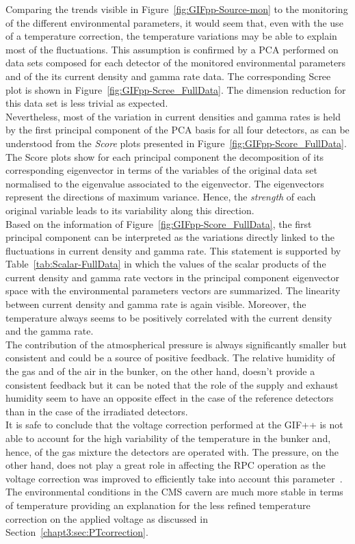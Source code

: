 	Comparing the trends visible in Figure~\ref{fig:GIFpp-Source-mon} to the monitoring of the different environmental parameters, it would seem that, even with the use of a temperature correction, the temperature variations may be able to explain most of the fluctuations. This assumption is confirmed by a PCA performed on data sets composed for each detector of the monitored environmental parameters and of the its current density and gamma rate data. The corresponding Scree plot is shown in Figure~\ref{fig:GIFpp-Scree_FullData}. The dimension reduction for this data set is less trivial as expected.\\
	Nevertheless, most of the variation in current densities and gamma rates is held by the first principal component of the PCA basis for all four detectors, as can be understood from the \textit{Score} plots presented in Figure~\ref{fig:GIFpp-Score_FullData}. The Score plots show for each principal component the decomposition of its corresponding eigenvector in terms of the variables of the original data set normalised to the eigenvalue associated to the eigenvector. The eigenvectors represent the directions of maximum variance. Hence, the \textit{strength} of each original variable leads to its variability along this direction.\\
	Based on the information of Figure~\ref{fig:GIFpp-Score_FullData}, the first principal component can be interpreted as the variations directly linked to the fluctuations in current density and gamma rate. This statement is supported by Table~\ref{tab:Scalar-FullData} in which the values of the scalar products of the current density and gamma rate vectors in the principal component eigenvector space with the environmental parameters vectors are summarized. The linearity between current density and gamma rate is again visible. Moreover, the temperature always seems to be positively correlated with the current density and the gamma rate.\\
	The contribution of the atmospherical pressure is always significantly smaller but consistent and could be a source of positive feedback. The relative humidity of the gas and of the air in the bunker, on the other hand, doesn't provide a consistent feedback but it can be noted that the role of the supply and exhaust humidity seem to have an opposite effect in the case of the reference detectors than in the case of the irradiated detectors.\\
	It is safe to conclude that the voltage correction performed at the GIF++ is not able to account for the high variability of the temperature in the bunker and, hence, of the gas mixture the detectors are operated with. The pressure, on the other hand, does not play a great role in affecting the RPC operation as the voltage correction was improved to efficiently take into account this parameter~\cite{ABBRESCIA2013}. The environmental conditions in the CMS cavern are much more stable in terms of temperature providing an explanation for the less refined temperature correction on the applied voltage as discussed in Section~\ref{chapt3:sec:PTcorrection}.
	
